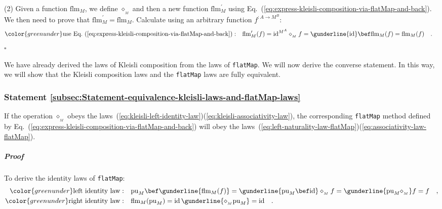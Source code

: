 (2) Given a function $\text{flm}_{M}$, we define $\diamond_{_{M}}$
and then a new function $\text{flm}_{M}^{\prime}$ using Eq.~(\ref{eq:express-kleisli-composition-via-flatMap-and-back}).
We then need to prove that $\text{flm}_{M}^{\prime}=\text{flm}_{M}$.
Calculate using an arbitrary function $f^{:A\rightarrow M^{B}}$:
\begin{align*}
{\color{greenunder}\text{use Eq.~(\ref{eq:express-kleisli-composition-via-flatMap-and-back})}:}\quad & \text{flm}_{M}^{\prime}(f)=\text{id}^{M^{A}}\diamond_{_{M}}f=\gunderline{\text{id}}\bef\text{flm}_{M}(f)=\text{flm}_{M}(f)\quad.
\end{align*}
$\square$

We have already derived the laws of Kleisli composition from the laws
of \lstinline!flatMap!. We will now derive the converse statement.
In this way, we will show that the Kleisli composition laws and the
\lstinline!flatMap! laws are fully equivalent.

\subsubsection{Statement \label{subsec:Statement-equivalence-kleisli-laws-and-flatMap-laws}\ref{subsec:Statement-equivalence-kleisli-laws-and-flatMap-laws}}

If the operation $\diamond_{_{M}}$ obeys the laws~(\ref{eq:kleisli-left-identity-law})\textendash (\ref{eq:kleisli-associativity-law}),
the corresponding \lstinline!flatMap! method defined by Eq.~(\ref{eq:express-kleisli-composition-via-flatMap-and-back})
will obey the laws~(\ref{eq:left-naturality-law-flatMap})\textendash (\ref{eq:associativity-law-flatMap}).

\subparagraph{Proof}

To derive the identity laws of \lstinline!flatMap!:
\begin{align*}
{\color{greenunder}\text{left identity law}:}\quad & \text{pu}_{M}\bef\gunderline{\text{flm}_{M}(f)}=\gunderline{\text{pu}_{M}\bef\text{id}}\diamond_{_{M}}f=\gunderline{\text{pu}_{M}\diamond_{_{M}}}f=f\quad,\\
{\color{greenunder}\text{right identity law}:}\quad & \text{flm}_{M}(\text{pu}_{M})=\text{id}\,\gunderline{\diamond_{_{M}}\text{pu}_{M}}=\text{id}\quad.
\end{align*}

